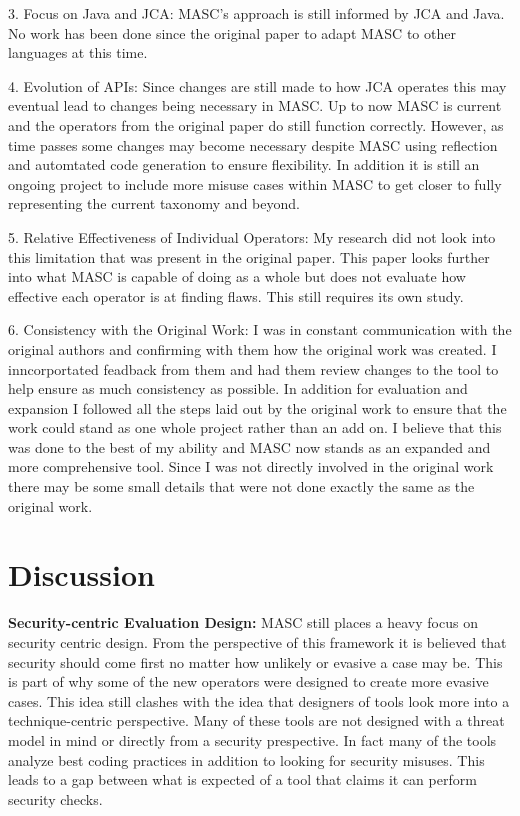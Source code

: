 3. Focus on Java and JCA: MASC's approach is still informed by JCA and Java. No work has been done since the original paper to adapt MASC to other languages at this time.

4. Evolution of APIs: Since changes are still made to how JCA operates this may eventual lead to changes being necessary in MASC. Up to now MASC is current and the operators from the original paper do still function correctly. However, as time passes some changes may become necessary despite MASC using reflection and automtated code generation to ensure flexibility. In addition it is still an ongoing project to include more misuse cases within MASC to get closer to fully representing the current taxonomy and beyond.

5. Relative Effectiveness of Individual Operators: My research did not look into this limitation that was present in the original paper. This paper looks further into what MASC is capable of doing as a whole but does not evaluate how effective each operator is at finding flaws. This still requires its own study.

6. Consistency with the Original Work: I was in constant communication with the original authors and confirming with them how the original work was created. I inncorportated feadback from them and had them review changes to the tool to help ensure as much consistency as possible. In addition for evaluation and expansion I followed all the steps laid out by the original work to ensure that the work could stand as one whole project rather than an add on. I believe that this was done to the best of my ability and MASC now stands as an expanded and more comprehensive tool. Since I was not directly involved in the original work there may be some small details that were not done exactly the same as the original work.

\section{Discussion}
\label{ch6:sec:discussion}

\textbf{Security-centric Evaluation Design:}
MASC still places a heavy focus on security centric design. From the perspective of this framework it is believed that security should come first no matter how unlikely or evasive a case may be. This is part of why some of the new operators were designed to create more evasive cases. This idea still clashes with the idea that designers of tools look more into a technique-centric perspective. Many of these tools are not designed with a threat model in mind or directly from a security prespective. In fact many of the tools analyze best coding practices in addition to looking for security misuses. This leads to a gap between what is expected of a tool that claims it can perform security checks.

